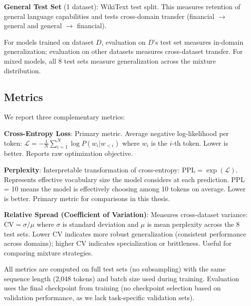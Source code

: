 \textbf{General Test Set} (1 dataset): WikiText test split. This measures retention of general language capabilities and tests cross-domain transfer (financial $\to$ general and general $\to$ financial).

For models trained on dataset $D$, evaluation on $D$'s test set measures in-domain generalization; evaluation on other datasets measures cross-dataset transfer. For mixed models, all 8 test sets measure generalization across the mixture distribution.

\subsection{Metrics}

We report three complementary metrics:

\textbf{Cross-Entropy Loss}: Primary metric. Average negative log-likelihood per token: $\mathcal{L} = -\frac{1}{N}\sum_{i=1}^{N} \log P(w_i | w_{<i})$ where $w_i$ is the $i$-th token. Lower is better. Reports raw optimization objective.

\textbf{Perplexity}: Interpretable transformation of cross-entropy: $\text{PPL} = \exp(\mathcal{L})$. Represents effective vocabulary size the model considers at each prediction. PPL = 10 means the model is effectively choosing among 10 tokens on average. Lower is better. Primary metric for comparisons in this thesis.

\textbf{Relative Spread (Coefficient of Variation)}: Measures cross-dataset variance: $\text{CV} = \sigma / \mu$ where $\sigma$ is standard deviation and $\mu$ is mean perplexity across the 8 test sets. Lower CV indicates more robust generalization (consistent performance across domains); higher CV indicates specialization or brittleness. Useful for comparing mixture strategies.

All metrics are computed on full test sets (no subsampling) with the same sequence length (2,048 tokens) and batch size used during training. Evaluation uses the final checkpoint from training (no checkpoint selection based on validation performance, as we lack task-specific validation sets).
